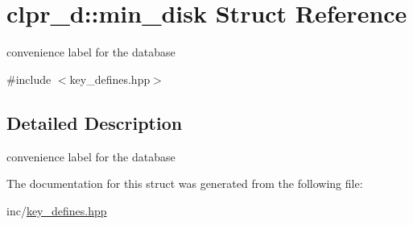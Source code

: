 \hypertarget{structclpr__d_1_1min__disk}{\section{clpr\-\_\-d\-:\-:min\-\_\-disk \-Struct \-Reference}
\label{structclpr__d_1_1min__disk}
}


convenience label for the database  




{\ttfamily \#include $<$key\-\_\-defines.\-hpp$>$}



\subsection{\-Detailed \-Description}
convenience label for the database 

\-The documentation for this struct was generated from the following file\-:\begin{DoxyCompactItemize}
\item 
inc/\hyperlink{key__defines_8hpp}{key\-\_\-defines.\-hpp}\end{DoxyCompactItemize}
